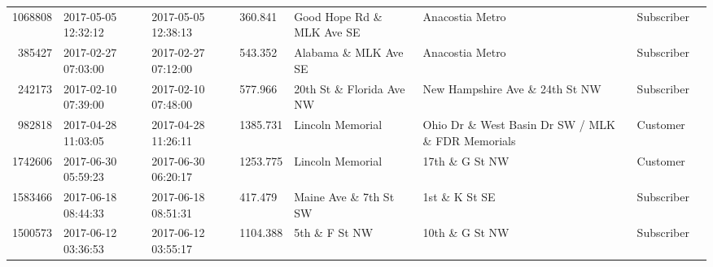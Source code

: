 \documentclass[11pt]{article}
\begin{document}
\begin{description}
\begin{tabular}{r|lllllll}
	 1068808                                          & 2017-05-05 12:32:12                              & 2017-05-05 12:38:13                              &  360.841                                         & Good Hope Rd \& MLK Ave SE                      & Anacostia Metro                                  & Subscriber                                      \\
	  385427                                          & 2017-02-27 07:03:00                              & 2017-02-27 07:12:00                              &  543.352                                         & Alabama \& MLK Ave SE                           & Anacostia Metro                                  & Subscriber                                      \\
	  242173                                            & 2017-02-10 07:39:00                                & 2017-02-10 07:48:00                                &  577.966                                           & 20th St \& Florida Ave NW                         & New Hampshire Ave \& 24th St NW                   & Subscriber                                        \\
	  982818                                              & 2017-04-28 11:03:05                                  & 2017-04-28 11:26:11                                  & 1385.731                                             & Lincoln Memorial                                     & Ohio Dr \& West Basin Dr SW / MLK \& FDR Memorials & Customer                                            \\
	 1742606                                            & 2017-06-30 05:59:23                                & 2017-06-30 06:20:17                                & 1253.775                                           & Lincoln Memorial                                   & 17th \& G St NW                                   & Customer                                          \\
	 1583466                                            & 2017-06-18 08:44:33                                & 2017-06-18 08:51:31                                &  417.479                                           & Maine Ave \& 7th St SW                            & 1st \& K St SE                                    & Subscriber                                        \\
	 1500573                                            & 2017-06-12 03:36:53                                & 2017-06-12 03:55:17                                & 1104.388                                           & 5th \& F St NW                                    & 10th \& G St NW                                   & Subscriber                                        \\

\end{tabular}
\end{description}
\end{document}
